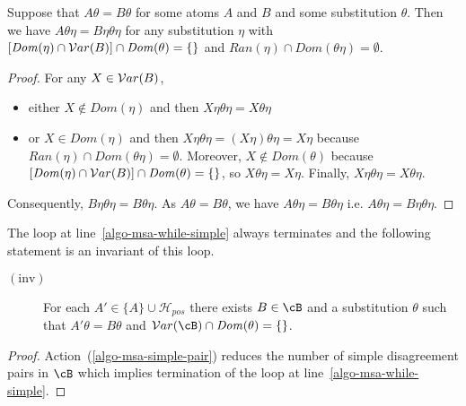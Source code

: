 \documentclass[fleqn]{tlp}
\newcommand{\Dom}{\mathit{Dom}}
\newcommand{\Ran}{\mathit{Ran}}
\newcommand{\Hpos}{\mathcal{H}_{\mathit{pos}}}
\begin{document}
\begin{appendix}
\begin{lemma}\label{lemma:technical-1}
  Suppose that $A\theta=B\theta$ for some atoms $A$ and $B$
  and some substitution $\theta$.
  Then we have $A\theta\eta=B\eta\theta\eta$ for any
  substitution $\eta$ with
  $[\Dom(\eta)\cap \Var(B)]\cap\Dom(\theta)=\emptyset$
  and
  $Ran(\eta)\cap\Dom(\theta\eta)=\emptyset$.
\end{lemma}
\begin{proof}
  For any $X\in{\cal V}ar(B)$, 
  \begin{itemize}
  \item either $X\not\in\Dom(\eta)$ and then 
    $X\eta\theta\eta=X\theta\eta$
  \item or $X\in\Dom(\eta)$ and then
    $X\eta\theta\eta=(X\eta)\theta\eta=X\eta$
    because $\Ran(\eta)\cap\Dom(\theta\eta)=\emptyset$.
    Moreover, $X\not\in\Dom(\theta)$ because
    $[\Dom(\eta)\cap \Var(B)]\cap\Dom(\theta)=\emptyset$,
    so $X\theta\eta=X\eta$.
    Finally, $X\eta\theta\eta=X\theta\eta$.
  \end{itemize}
  Consequently, $B\eta\theta\eta=B\theta\eta$.
  As $A\theta=B\theta$, we have $A\theta\eta=B\theta\eta$
  i.e. $A\theta\eta=B\eta\theta\eta$.
\end{proof}

\begin{proposition}\label{proposition:invariant-correction-algo-pos-1}
  The loop at line~\ref{algo-msa-while-simple} always terminates
  and the following statement is an invariant of this loop.
  \begin{description}
  \item[$\mathrm{(inv)}$] For each $A'\in\{A\}\cup\Hpos$ there exists 
    $B\in\cB$ and a substitution $\theta$ such that
    $A'\theta=B\theta$ and
    $\Var(\cB)\cap\Dom(\theta)=\emptyset$. 
  \end{description}
\end{proposition}
\begin{proof}
  Action~(\ref{algo-msa-simple-pair})
  reduces the number of simple disagreement pairs in
  $\cB$ which implies termination of the 
  loop at line~\ref{algo-msa-while-simple}.


\end{proof}
\end{appendix}
\end{document}
